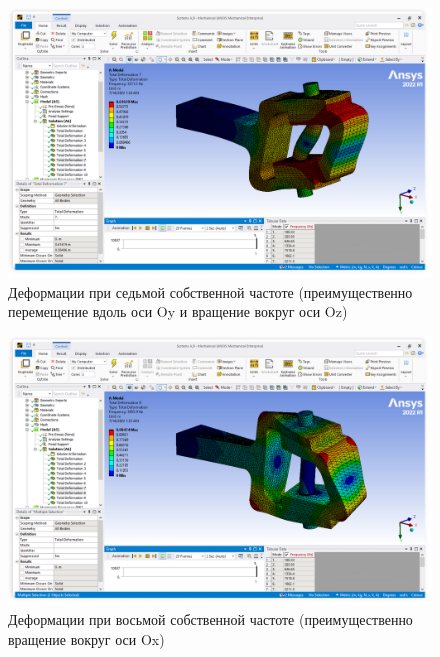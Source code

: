 \begin{figure}[H] 
	\center
	\includegraphics[width=\textwidth]{images/mod7.png}
	\caption{Деформации при седьмой собственной частоте (преимущественно перемещение вдоль оси Oy и вращение вокруг оси Oz)}
	\label{fig:mod7}
\end{figure}

\begin{figure}[H] 
	\center
	\includegraphics[width=\textwidth]{images/mod8.png}
	\caption{Деформации при восьмой собственной частоте (преимущественно вращение вокруг оси Ox)}
	\label{fig:mod8}
\end{figure}

